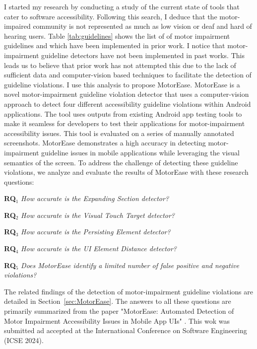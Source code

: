 I started my research by conducting a study of the current state of tools that cater to software accessibility.
Following this search, I deduce that the motor-impaired community is not represented as much as low vision or deaf and hard of hearing users. Table \ref{tab:guidelines} shows the list of of motor impairment guidelines and which have been implemented in prior work. I notice that motor-impairment guideline detectors have not been implemented in past works. This leads us to believe that prior work has not attempted this due to the lack of sufficient data and computer-vision based techniques to facilitate the detection of guideline violations. 
I use this analysis to propose MotorEase. MotorEase is a novel motor-impairment guideline violation detector that uses a computer-vision approach to detect four different accessibility guideline violations within Android applications. The tool uses outputs from existing Android app testing tools to make it seamless for developers to test their applications for motor-impairment accessibility issues. This tool is evaluated on a series of manually annotated screenshots. MotorEase demonstrates a high accuracy in detecting motor-impairment guideline issues in mobile applications while leveraging the visual semantics of the screen. 
To address the challenge of detecting these guideline violations, we analyze and evaluate the results of MotorEase with these research questions: 


\begin{description}
		\item{\textbf{RQ$_1$} \textit{How accurate is the Expanding Section detector?}}
		\item{\textbf{RQ$_2$} \textit{How accurate is the Visual Touch Target detector?}}
        \item{\textbf{RQ$_3$} \textit{How accurate is the Persisting Element detector?}}
        \item{\textbf{RQ$_4$} \textit{How accurate is the UI Element Distance detector?}}
		\item{\textbf{RQ$_5$} \textit{Does MotorEase identify a limited number of false positive and negative violations?}}
\end{description}

The related findings of the detection of motor-impairment guideline violations are detailed in Section~\ref{sec:MotorEase}. The answers to all these questions are primarily summarized from the paper "MotorEase: Automated Detection of Motor Impairment Accessibility Issues in Mobile App UIs" \cite{Krishnavajjala24}. This wok was submitted ad accepted at the International Conference on Software Engineering (ICSE 2024). 




